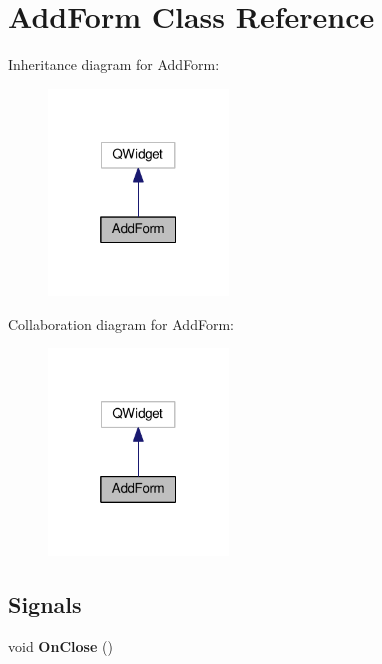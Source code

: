 \hypertarget{class_add_form}{}\section{Add\+Form Class Reference}
\label{class_add_form}


Inheritance diagram for Add\+Form\+:\nopagebreak
\begin{figure}[H]
\begin{center}
\leavevmode
\includegraphics[width=136pt]{class_add_form__inherit__graph}
\end{center}
\end{figure}


Collaboration diagram for Add\+Form\+:\nopagebreak
\begin{figure}[H]
\begin{center}
\leavevmode
\includegraphics[width=136pt]{class_add_form__coll__graph}
\end{center}
\end{figure}
\subsection*{Signals}
\begin{DoxyCompactItemize}
\item 
void {\bfseries On\+Close} ()\hypertarget{class_add_form_aa161d4984cedd6ca6cc3dab1641beeea}{}\label{class_add_form_aa161d4984cedd6ca6cc3dab1641beeea}

\end{DoxyCompactItemize}
